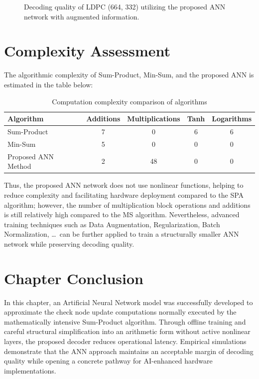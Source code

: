\documentclass[a4paper,14pt]{extreport}
\begin{document}
\begin{figure}[H]
    \centering
    \caption{Decoding quality of LDPC (664, 332) utilizing the proposed ANN network with augmented information.}
    \label{fig:ber_scenario2}
\end{figure}

\section{Complexity Assessment}

The algorithmic complexity of Sum-Product, Min-Sum, and the proposed ANN is estimated in the table below:

\begin{table}[H]
    \centering
    \caption{Computation complexity comparison of algorithms}
    \label{tab:complexity}
    \begin{tabular}{lcccc}
        \toprule
        \textbf{Algorithm} & \textbf{Additions} & \textbf{Multiplications} & \textbf{Tanh} & \textbf{Logarithms} \\
        \midrule
        Sum-Product          & 7                   & 0                   & 6             & 6                 \\
        Min-Sum              & 5                   & 0                   & 0             & 0                 \\
        Proposed ANN Method  & 2                   & 48                  & 0             & 0                 \\
        \bottomrule
    \end{tabular}
\end{table}

Thus, the proposed ANN network does not use nonlinear functions, helping to reduce complexity and facilitating hardware deployment compared to the SPA algorithm; however, the number of multiplication block operations and additions is still relatively high compared to the MS algorithm. Nevertheless, advanced training techniques such as Data Augmentation, Regularization, Batch Normalization, \ldots\ can be further applied to train a structurally smaller ANN network while preserving decoding quality.

\section{Chapter Conclusion}
In this chapter, an Artificial Neural Network model was successfully developed to approximate the check node update computations normally executed by the mathematically intensive Sum-Product algorithm. Through offline training and careful structural simplification into an arithmetic form without active nonlinear layers, the proposed decoder reduces operational latency. Empirical simulations demonstrate that the ANN approach maintains an acceptable margin of decoding quality while opening a concrete pathway for AI-enhanced hardware implementations.
\end{document}
